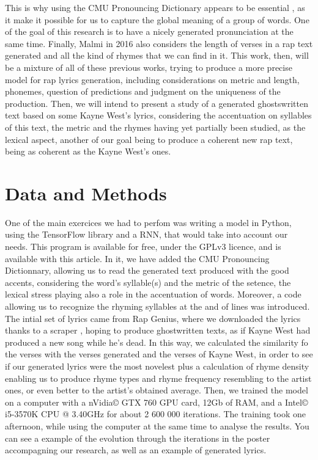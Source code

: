 \documentclass[12pt,a4paper]{article}
\begin{document}
This is why using the CMU Pronouncing Dictionary appears to be essential \cite{hirjee_using_2010}, as it make it possible for us to capture the global meaning of a group of words. One of the goal of this research is to have a nicely generated pronunciation at the same time. Finally, Malmi in 2016 also considers the length of verses in a rap text generated and all the kind of rhymes that we can find in it. This work, then, will be a mixture of all of these previous works, trying to produce a more precise model for rap lyrics generation, including considerations on metric and length, phonemes, question of predictions and judgment on the uniqueness of the production. Then, we will intend to present a study of a generated ghostswritten text based on some Kayne West's lyrics, considering the accentuation on syllables of this text, the metric and the rhymes having yet partially been studied, as the lexical aspect, another of our goal being to produce a coherent new rap text, being as coherent as the Kayne West's ones. \newline

\section{Data and Methods}

One of the main exercices we had to perfom was writing a model in Python, using the TensorFlow library and a RNN, that would take into account our needs. This program is available for free, under the GPLv3 licence, and is available with this article. In it, we have added the CMU Pronouncing Dictionnary, allowing us to read the generated text produced with the good accents, considering the word's syllable(s) and the metric of the setence, the lexical stress playing also a role in the accentuation of words. Moreover, a code allowing us to recognize the rhyming syllables at the and of lines was introduced. The intial set of lyrics came from Rap Genius, where we downloaded the lyrics thanks to a scraper \cite{paupier_raplyrics-scraper_2018}, hoping to produce ghostwritten texts, as if Kayne West had produced a new song while he's dead. In this way, we calculated the similarity fo the verses with the verses generated and the verses of Kayne West, in order to see if our generated lyrics were the most novelest plus a calculation of rhyme density enabling us to produce rhyme types and rhyme frequency resembling to the artist ones, or even better to the artist’s obtained average. Then, we trained the model on a computer with a nVidia© GTX 760 GPU card, 12Gb of RAM, and a Intel©  i5-3570K CPU @ 3.40GHz for about 2 600 000 iterations. The training took one afternoon, while using the computer at the same time to analyse the results. You can see a example of the evolution through the iterations in the poster accompagning our research, as well as an example of generated lyrics.



\end{document}

